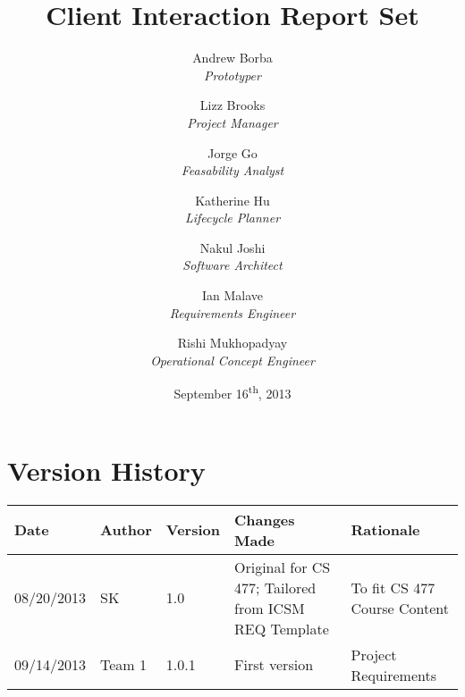 \documentclass[titlepage]{article}
\title{Client Interaction Report Set}
\author{
	Andrew Borba\\ \emph{Prototyper}	\and
	 Lizz Brooks\\ \emph{Project Manager}	\and
	 Jorge Go\\ \emph{Feasability Analyst}	\and
	 Katherine Hu\\ \emph{Lifecycle Planner}	\and
	 Nakul Joshi\\ \emph{Software Architect}	\and
	 Ian Malave\\ \emph{Requirements Engineer}	\and
	 Rishi Mukhopadyay\\ \emph{Operational Concept Engineer}
}
\date{September 16\textsuperscript{th}, 2013}
\begin{document}
\pagestyle{fancy}
\chead{}
\lfoot{}
\cfoot{\thepage}
\rfoot{}

\maketitle
\tableofcontents
\newpage
\section{Version History}
\begin{table}[h]
	\centering
    \begin{tabularx}{\textwidth}{lllXX}
    	\hline
        Date       & Author & Version & Changes Made                                         & Rationale                    \\ \hline
        08/20/2013 & SK     & 1.0     & Original for CS 477; Tailored from ICSM REQ Template & To fit CS 477 Course Content \\ 
        09/14/2013 & Team 1 & 1.0.1   & First version                                                   & Project Requirements                          \\
		\hline
    \end{tabularx}
\end{table}
\newpage

\newpage

\newpage

\newpage

		
\end{document}
